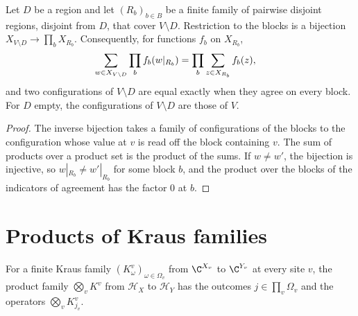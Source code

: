 \begin{lemma}
    \label{lem:sites_partition}
    \leanok
    Let $D$ be a region and let $(R_b)_{b\in B}$ be a finite family of pairwise
    disjoint regions, disjoint from $D$, that cover $V\setminus D$. Restriction to
    the blocks is a bijection $X_{V\setminus D}\to\prod_bX_{R_b}$. Consequently, for
    functions $f_b$ on $X_{R_b}$,
    \begin{align}
        \sum_{w\in X_{V\setminus D}}\prod_bf_b(w|_{R_b})
        &=\prod_b\sum_{z\in X_{R_b}}f_b(z),
        \notag
    \end{align}
    and two configurations of $V\setminus D$ are equal exactly when they agree on
    every block. For $D$ empty, the configurations of $V\setminus D$ are those of $V$.
\end{lemma}
\begin{proof}\leanok
    The inverse bijection takes a family of configurations of the blocks to the
    configuration whose value at $v$ is read off the block containing $v$. The sum
    of products over a product set is the product of the sums. If $w\neq w'$, the
    bijection is injective, so $w|_{R_b}\neq w'|_{R_b}$ for some block $b$, and the
    product over the blocks of the indicators of agreement has the factor $0$ at
    $b$.
\end{proof}

\section{Products of Kraus families}
\label{sec:sites_product_family}

\begin{definition}
    \label{def:sites_product_family}
    \leanok
    For a finite Kraus family $(K^v_\omega)_{\omega\in\Omega_v}$ from $\C^{X_v}$ to
    $\C^{Y_v}$ at every site $v$, the product family $\bigotimes_vK^v$ from $\mathcal H_X$ to
    $\mathcal H_Y$ has the outcomes $j\in\prod_v\Omega_v$ and the operators
    $\bigotimes_vK^v_{j_v}$.
\end{definition}

